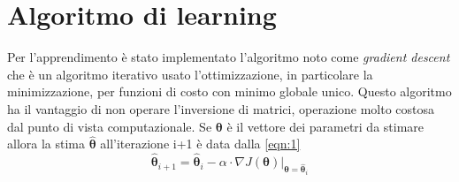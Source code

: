 \section{Algoritmo di learning}
Per l'apprendimento è stato implementato l'algoritmo noto come \textit{gradient descent} che è un algoritmo iterativo usato l'ottimizzazione, in particolare la minimizzazione, per funzioni di costo con minimo globale unico. Questo algoritmo ha il vantaggio di non operare l'inversione di matrici, operazione molto costosa dal punto di vista computazionale. Se $\pmb\theta$ è il vettore dei parametri da stimare allora la stima $\hat{\pmb\theta}$ all'iterazione i+1 è data dalla \ref{eqn:1}
\begin{equation}
	\label{eqn:1}
	\hat{\pmb\theta}_{i+1} = \hat{\pmb\theta}_{i} -\alpha\cdot\nabla J(\pmb\theta)|_{\pmb\theta = \hat{\pmb\theta}_{i}}
\end{equation}

